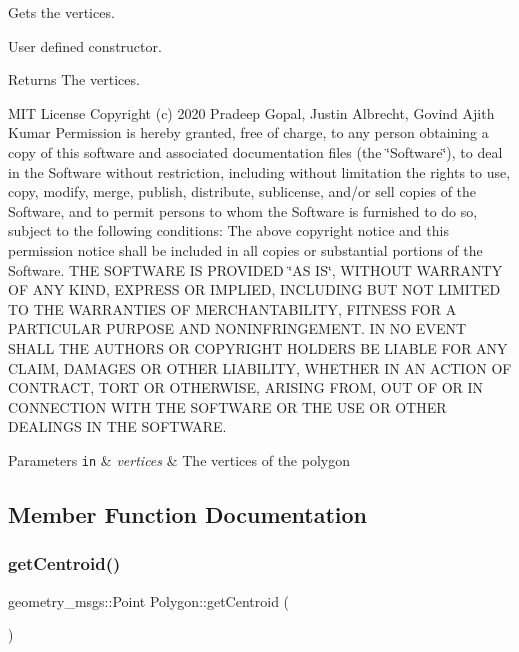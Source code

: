 Gets the vertices. 

User defined constructor.

\begin{DoxyReturn}{Returns}
The vertices.
\end{DoxyReturn}
M\+IT License Copyright (c) 2020 Pradeep Gopal, Justin Albrecht, Govind Ajith Kumar Permission is hereby granted, free of charge, to any person obtaining a copy of this software and associated documentation files (the \char`\"{}\+Software\char`\"{}), to deal in the Software without restriction, including without limitation the rights to use, copy, modify, merge, publish, distribute, sublicense, and/or sell copies of the Software, and to permit persons to whom the Software is furnished to do so, subject to the following conditions\+: The above copyright notice and this permission notice shall be included in all copies or substantial portions of the Software. T\+HE S\+O\+F\+T\+W\+A\+RE IS P\+R\+O\+V\+I\+D\+ED \char`\"{}\+A\+S I\+S\char`\"{}, W\+I\+T\+H\+O\+UT W\+A\+R\+R\+A\+N\+TY OF A\+NY K\+I\+ND, E\+X\+P\+R\+E\+SS OR I\+M\+P\+L\+I\+ED, I\+N\+C\+L\+U\+D\+I\+NG B\+UT N\+OT L\+I\+M\+I\+T\+ED TO T\+HE W\+A\+R\+R\+A\+N\+T\+I\+ES OF M\+E\+R\+C\+H\+A\+N\+T\+A\+B\+I\+L\+I\+TY, F\+I\+T\+N\+E\+SS F\+OR A P\+A\+R\+T\+I\+C\+U\+L\+AR P\+U\+R\+P\+O\+SE A\+ND N\+O\+N\+I\+N\+F\+R\+I\+N\+G\+E\+M\+E\+NT. IN NO E\+V\+E\+NT S\+H\+A\+LL T\+HE A\+U\+T\+H\+O\+RS OR C\+O\+P\+Y\+R\+I\+G\+HT H\+O\+L\+D\+E\+RS BE L\+I\+A\+B\+LE F\+OR A\+NY C\+L\+A\+IM, D\+A\+M\+A\+G\+ES OR O\+T\+H\+ER L\+I\+A\+B\+I\+L\+I\+TY, W\+H\+E\+T\+H\+ER IN AN A\+C\+T\+I\+ON OF C\+O\+N\+T\+R\+A\+CT, T\+O\+RT OR O\+T\+H\+E\+R\+W\+I\+SE, A\+R\+I\+S\+I\+NG F\+R\+OM, O\+UT OF OR IN C\+O\+N\+N\+E\+C\+T\+I\+ON W\+I\+TH T\+HE S\+O\+F\+T\+W\+A\+RE OR T\+HE U\+SE OR O\+T\+H\+ER D\+E\+A\+L\+I\+N\+GS IN T\+HE S\+O\+F\+T\+W\+A\+RE. 
\begin{DoxyParams}[1]{Parameters}
\mbox{\tt in}  & {\em vertices} & The vertices of the polygon \\
\hline
\end{DoxyParams}


\subsection{Member Function Documentation}
\mbox{\label{class_polygon_a9816eb2e2f0fcd11b229d753205b5996}} 
\subsubsection{\texorpdfstring{get\+Centroid()}{getCentroid()}}
{\footnotesize\ttfamily geometry\+\_\+msgs\+::\+Point Polygon\+::get\+Centroid (\begin{DoxyParamCaption}{ }\end{DoxyParamCaption})}



